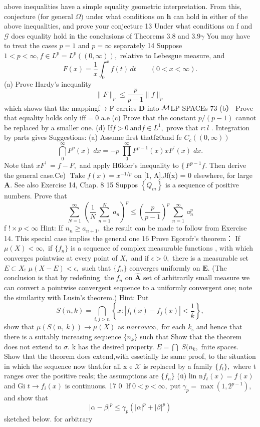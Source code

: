 above inequalities have a simple equality geometric interpretation. From this, conjecture (for general $\Omega\mathrm{)}$ under what conditions on ${\boldsymbol{h}}$ can hold in either of the above inequalities, and prove your conjecture 13 Under what conditions on f and $\scriptstyle{\mathcal{G}}$ does equality hold in the conclusions of Theorems $3.8$ and $3.9\gamma$ You may have to treat the cases $p=1$ and $p=\infty$ separately 14 Suppose $1<p<\infty,f\in L^{p}=L^{p}((0,\infty)),$ relative to Lebesgue measure, and $$ F(x)={\frac{1}{x}}\int_{0}^{x}\!f(t)\,d t\qquad(0<x<\infty). $$ (a) Prove Hardy's inequality $$ \|F\|_{p}\leq{\frac{p}{p-1}}\parallel f\|_{p} $$ which shows that the mappingf→ F carries ${\boldsymbol{D}}$ into $\bar{\cal M}$LP-SPACEs 73 (b） Prove that equality holds only ${\mathrm{iff}}=0$ a.e (c) Prove that the constant $p/(p-1)$ cannot be replaced by a smaller one. (d) ${\mathrm{If}}f>0{\mathrm{~and}}f\in L^{1},$ prove that $\scriptstyle r:l$ . Integration by parts gives Suggestions: (a) Assume first thatf≥0and fe $C_{c}((0,\infty))$ $$ \bigcap_{0}^{\infty}F^{p}(x)\;d x=-p\;\prod_{0}^{\infty}F^{p-1}(x)x F^{\prime}(x)\;d x. $$ Note that $x F^{\prime}\ {=}f-F,$ and apply H6lder's inequality to $\{\,F^{p-1}f.$ Then derive the general case.Ce) $\operatorname{Take}f(x)=x^{-1/p}$ on [1, A],Jf(x) = 0 elsewhere, for large ${\boldsymbol{A}}.$ See also Exercise 14, Chap. 8 15 Suppos $\left\{Q_{m}\right\}$ is a sequence of positive numbers. Prove that $$ \sum_{N=1}^{\infty}\,\left({\frac{1}{N}}\,\sum_{n=1}^{N}\,a_{n}\right)^{p}\leq\left({\frac{p}{p-1}}\right)^{p}\,\sum_{n=1}^{\infty}\,a_{n}^{p} $$ f $\mathbb{!}\times p<\infty$ Hint: If $n_{n}\geq a_{n+1},$ the result can be made to follow from Exercise 14. This special case implies the general one 16 Prove Egorofr's theorem： If $\mu(X)<\infty,$ if $\{f_{n}\}$ is a sequence of complex measurable functions , with which converges pointwise at every point of $X,$ and if $\epsilon>0,$ there is a measurable set $E\subset X_{!}$ $\mu(X-E)<\epsilon,$ such that $\{f_{n}\}$ converges uniformly on ${\boldsymbol{E}}.$ (The conclusion is that by redefining $\operatorname{the}f_{n}$ on $\hat{\boldsymbol{A}}$ set of arbitrarily small measure we can convert a pointwise convergent sequence to a uniformly convergent one; note the similarity with Lusin's theorem.) Hint: Put $$ S(n,k)=\bigcap_{i,j>n}\left\{x:|f_{i}(x)-f_{j}(x)|<{\frac{1}{k}}\right\}, $$ show that $\mu(S(n,\ k))\to\mu(X)$ as $n arrow\infty,$ for each $k_{\mathrm{{s}}}$ and hence that there is a suitably increasing sequence $\{n_{k}\}$ such that Show that the theorem does not extend to ${\sigma}.$ k has the desired property. $E=\bigcap$ $S(n_{k},$ fnite spaces. Show that the theorem does extend,with essetially he same proof, to the situation in which the sequence now that,for all x e $\scriptstyle{\mathcal{X}}$ is replaced by a family $\{f_{t}\},$ where t ranges over the positive reals; the assumptions are $\{f_{n}\}$ (ü) lin ${\textrm{n}}f_{t}(x)=f(x)$ and Gi $t\to f_{i}(x)$ is continuous. 17 0 $\operatorname{lf}0<p<\infty,\operatorname{put}\gamma_{p}=\operatorname*{max}\left(1,2^{p-1}\right),$ and show that $$ |\alpha-\beta|^{p}\leq\gamma_{p}(|\alpha|^{p}+|\beta|^{p}) $$ sketched below. for arbitrary 